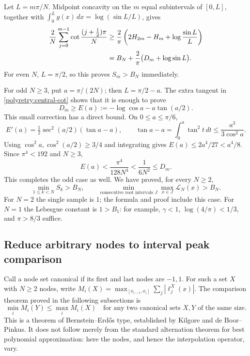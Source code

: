 \documentclass[11pt]{article}
\theoremstyle{remark}\newtheorem{remark}[theorem]{Remark}
\begin{document}
Let $L=m\pi/N$.  Midpoint concavity on the $m$ equal subintervals
of $[0,L]$, together with
$\int_0^L g(x)\,dx=\log(\sin L/L)$, gives
\begin{align}
 \frac2N\sum_{j=0}^{m-1}\cot\frac{(j+\tfrac12)\pi}{N}
 &\ge\frac2\pi\left(2H_{2m}-H_m+
                  \log\frac{\sin L}{L}\right)\notag\\
 &=B_N+\frac2\pi\bigl(D_m+\log\sin L\bigr).
 \label{polyretry:midpoint-bound}
\end{align}
For even $N$, $L=\pi/2$, so this proves $S_m>B_N$ immediately.

For odd $N\ge3$, put $a=\pi/(2N)$; then $L=\pi/2-a$.
The extra tangent in \eqref{polyretry:central-cot} shows that it is
enough to prove
\[
 D_m\ge E(a):=-\log\cos a-a\tan(a/2).
\]
This small correction has a direct bound.  On $0\le a\le\pi/6$,
\[
 E'(a)=\tfrac12\sec^2(a/2)(\tan a-a),\qquad
 \tan a-a=\int_0^a\tan^2t\,dt\le\frac{a^3}{3\cos^2a}.
\]
Using $\cos^2a,\cos^2(a/2)\ge3/4$ and integrating gives
$E(a)\le2a^4/27<a^4/8$.  Since $\pi^4<192$ and $N\ge3$,
\[
 E(a)<\frac{\pi^4}{128N^4}<\frac1{6N^2}\le D_m.
\]
This completes the odd case as well.  We have proved, for every $N\ge2$,
\begin{equation}\label{polyretry:all-intervals}
 \min_{1\le k<N}S_k>B_N,
 \qquad
 \min_{\text{consecutive root intervals }J}
            \max_{x\in J}\mathcal L_N(x)>B_N.
\end{equation}
For $N=2$ the single sample is $1$; the formula and proof include this
case.  For $N=1$ the Lebesgue constant is $1>B_1$: for example,
$\gamma<1$, $\log(4/\pi)<1/3$, and $\pi>8/3$ suffice.

\subsection{Reduce arbitrary nodes to interval peak comparison}

Call a node set canonical if its first and last nodes are $-1,1$.
For such a set $X$ with $N\ge2$ nodes, write
$M_i(X)=\max_{[x_{i-1},x_i]}\sum_j|\ell_j^X(x)|$.
The comparison theorem proved in the following subsections is
\begin{equation}\label{polyretry:comparison}
 \min_i M_i(Y)\le\max_i M_i(X)
 \quad\text{for any two canonical sets $X,Y$ of the same size.}
\end{equation}
This is a theorem of Bernstein--Erd\H{o}s type, established by
Kilgore and de Boor--Pinkus.  It does not follow merely from the standard
alternation theorem for best polynomial approximation: here the nodes,
and hence the interpolation operator, vary.
\end{document}
